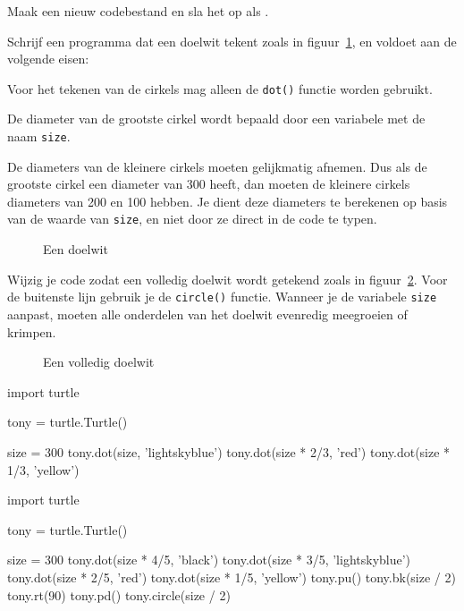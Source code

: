 \documentclass[../main]{subfiles}
\begin{document}
\begin{opgave}[icons={laptop}]
Maak een nieuw codebestand en sla het op als .
\begin{qlist}
\item Schrijf een programma dat een doelwit tekent zoals in figuur~\ref{fig:turtle-target}, en voldoet aan de volgende eisen:
\begin{tasklist}
\item Voor het tekenen van de cirkels mag alleen de \texttt{dot()} functie worden gebruikt.
\item De diameter van de grootste cirkel wordt bepaald door een variabele met de naam \texttt{size}.
\item De diameters van de kleinere cirkels moeten gelijkmatig afnemen. Dus als de grootste cirkel een diameter van 300 heeft, dan moeten de kleinere cirkels diameters van 200 en 100 hebben. Je dient deze diameters te berekenen op basis van de waarde van \texttt{size}, en niet door ze direct in de code te typen.
\end{tasklist}

\begin{figure}[ht]
    \centering
    \caption{Een doelwit}%
    \label{fig:turtle-target}
\end{figure}
\item Wijzig je code zodat een volledig doelwit wordt getekend zoals in figuur~\ref{fig:turtle-target-2}. Voor de buitenste lijn gebruik je de \texttt{circle()} functie. Wanneer je de variabele \texttt{size} aanpast, moeten alle onderdelen van het doelwit evenredig meegroeien of krimpen.

\begin{figure}[ht]
    \centering
    \caption{Een volledig doelwit}%
    \label{fig:turtle-target-2}
\end{figure}
\end{qlist}
\end{opgave}
\begin{antwoord}
\begin{qlist}
\item%
\begin{python-breakable}[style=mu-noframe]
import turtle

tony = turtle.Turtle()

size = 300
tony.dot(size, 'lightskyblue')
tony.dot(size * 2/3, 'red')
tony.dot(size * 1/3, 'yellow')
\end{python-breakable}
\item%
\begin{python-breakable}[style=mu-noframe]
import turtle

tony = turtle.Turtle()

size = 300
tony.dot(size * 4/5, 'black')
tony.dot(size * 3/5, 'lightskyblue')
tony.dot(size * 2/5, 'red')
tony.dot(size * 1/5, 'yellow')
tony.pu()
tony.bk(size / 2)
tony.rt(90)
tony.pd()
tony.circle(size / 2)
\end{python-breakable}
\end{qlist}

\end{antwoord}
\end{document}
